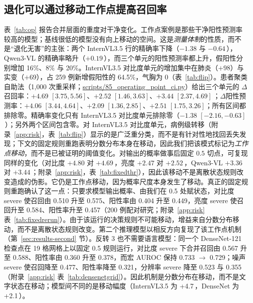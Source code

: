 \subsection{退化可以通过移动工作点提高召回率}
\label{sec:results-op}

表~\ref{tab:op} 报告合并层面的重度对干净变化。工作点案例是那些干净阳性预测率较高的模型；基线很低的模型没有向上移动的空间。这是\emph{测量体制}的性质，而不是``退化无害''的主张：两个 InternVL3.5 行的精确率下降（$-1.38$ 与 $-0.64$\,\pp{}），Qwen3-VL 的精确率略升（$+0.19$\,\pp{}），而三个单元的阳性预测率都上升，假阳性分别增加 16\%、8\% 与 20\%。InternVL3.5 对比度单元的增加集中在肺炎（$+98$）与实变（$+69$），占 259 例新增假阳性的 64.5\%，气胸为 0（表~\ref{tab:flip}）。患者聚类自助法（1,000 次重采样；\url{scripts/85_operating_point_ci.py}）给出三个单元的 $\Delta$召回率：$+4.69$ $[3.75,5.56]$、$+2.52$ $[1.46,3.63]$、$+3.44$ $[2.37,4.69]$\,\pp{}；$\Delta$阳性预测率：$+4.06$ $[3.44,4.64]$、$+2.09$ $[1.36,2.85]$、$+2.51$ $[1.75,3.26]$；所有区间都排除零。精确率变化只有 InternVL3.5 对比度单元排除零（$-1.38$ $[-2.16,-0.63]$\,\pp{}）；另外两个区间包含零。对 InternVL3.5 对比度单元，病例级转移（附录~\ref{app:risk}，表~\ref{tab:flip}）显示的是广泛重分类，而不是有针对性地找回丢失发现；下文的固定规则重跑表明分数分布本身在移动，因此我们把该模式标记为\emph{工作点移动}，而不是已被证明的阈值变化。对输出的概率做事后固定 $0.5$ 切点，可复现同样的变化（对比度 $+4.80$ 对 $+4.69$\,\pp{}，亮度 $+2.47$ 对 $+2.52$\,\pp{}，Qwen3-VL $+3.36$ 对 $+3.44$\,\pp{}；附录~\ref{app:risk}，表~\ref{tab:fixedthr}），因此该移动不是离散状态规则改变造成的伪影。它仍是工作点移动，因为概率尺度本身发生了移动。真正的固定规则重跑确认了这一点：只要求模型输出概率、由我们在 0.5 处赋状态，对比度 severe 使召回由 0.510 升至 0.575、阳性率由 0.404 升至 0.449，亮度 severe 使召回升至 0.584、阳性率升至 0.457（200 例配对研究；附录~\ref{app:risk} 表~\ref{tab:fixedrerun}）。由于该运行的决策规则不可能移动，增益来自分数分布移动，而不是离散状态规则改变。第二个推理模型以相反方向复现了该工作点机制（第~\ref{sec:results-second} 节）。反转 3 也不需要语言模型：同一个 DenseNet-121 检查点在 19 格网格上以固定 0.5 规则运行，对比度 severe 下合并召回由 0.567 升至 0.588、阳性率由 0.360 升至 0.378，而宏 AUROC 保持 0.733 $\rightarrow$ 0.729；噪声 severe 使召回降至 0.477、阳性率降至 0.321，分辨率 severe 降至 0.523 与 0.355（附录~\ref{app:risk} 表~\ref{tab:densenetgrid}）。因此机制是分数分布在移动，而不是文字状态在移动；模型间不同的是移动幅度（InternVL3.5 为 +4.7\,\pp{}，DenseNet 为 +2.1\,\pp{}）。

